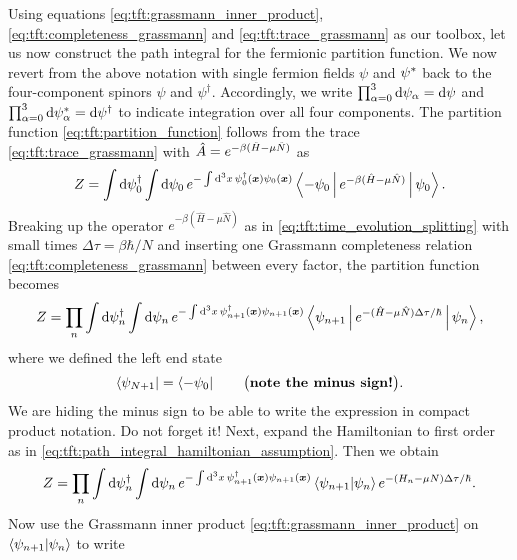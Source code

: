Using equations \eqref{eq:tft:grassmann_inner_product}, \eqref{eq:tft:completeness_grassmann} and \eqref{eq:tft:trace_grassmann} as our toolbox, let us now construct the path integral for the fermionic partition function.
We now revert from the above notation with single fermion fields $\psi$ and ${\psi}^*$ back to the four-component spinors $\psi$ and $\psi^\dagger$.
Accordingly, we write $\prod_{\alpha=0}^3 \mathop{}\!\mathrm{d} \psi_\alpha = \mathop{}\!\mathrm{d} \psi$ and $\prod_{\alpha=0}^3 \mathop{}\!\mathrm{d} {\psi}^*_\alpha = \mathop{}\!\mathrm{d} \psi^\dagger$ to indicate integration over all four components.
The partition function \eqref{eq:tft:partition_function} follows from the trace \eqref{eq:tft:trace_grassmann} with $\smash[t]{\hat{A}} = \smash[t]{e^{-\beta (\hat{H} - \mu \hat{N})}}$ as
\begin{equation}
	Z = \int \mathop{}\!\mathrm{d} \psi_0^\dagger \int \mathop{}\!\mathrm{d} \psi_0 \, e^{-\int \mathop{}\!\mathrm{d}^3 x \, \psi_{0}^\dagger({\bm{x}}) \psi_{0}({\bm{x}})} \Braket{-\psi_0 | e^{-\beta(\hat{H} - \mu \hat{N})} | \psi_0} .
\label{eq:tft:fermion_path_integral_after_completeness}
\end{equation}
Breaking up the operator $e^{-\beta (\hat{H} - \mu \hat{N})}$ as in \cref{eq:tft:time_evolution_splitting} with small times $\Delta \tau = \beta \hbar / N$ and inserting one Grassmann completeness relation \eqref{eq:tft:completeness_grassmann} between every factor, the partition function becomes
\begin{equation}
	Z = \prod_n \int \mathop{}\!\mathrm{d} \psi_n^\dagger \int \mathop{}\!\mathrm{d} \psi_n \, e^{-\int \mathop{}\!\mathrm{d}^3 x \, \psi_{n+1}^\dagger({\bm{x}}) \psi_{n+1}({\bm{x}})} \Braket{\psi_{n+1} | e^{-(\hat{H} - \mu \hat{N}) \Delta \tau / \hbar} | \psi_n} ,
\end{equation}
where we defined the left end state
\begin{equation}
	\bra{\psi_{N+1}} = \bra{-\psi_0} \qquad \big( \text{\textbf{note the minus sign!}} \big) .
\label{eq:tft:fermionic_end_state}
\end{equation}
We are hiding the minus sign to be able to write the expression in compact product notation.
Do not forget it!
Next, expand the Hamiltonian to first order as in \cref{eq:tft:path_integral_hamiltonian_assumption}.
Then we obtain
\begin{equation}
	Z = \prod_n \int \mathop{}\!\mathrm{d} \psi_n^\dagger \int \mathop{}\!\mathrm{d} \psi_n \, e^{-\int \mathop{}\!\mathrm{d}^3 x \, \psi_{n+1}^\dagger({\bm{x}}) \psi_{n+1}({\bm{x}})} \braket{\psi_{n+1} | \psi_n} e^{-(H_n - \mu N) \Delta \tau / \hbar} .
\end{equation}
Now use the Grassmann inner product \eqref{eq:tft:grassmann_inner_product} on $\braket{\psi_{n+1} | \psi_n}$ to write
